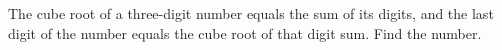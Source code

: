 The cube root of a three-digit number equals the sum of its digits, and the last digit of the number equals the cube root of that digit sum. Find the number.
